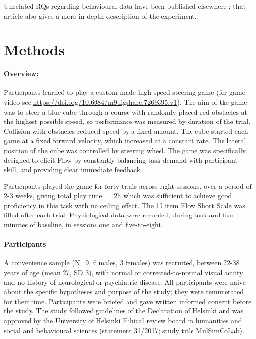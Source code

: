 \documentclass[10pt,letterpaper,floatsintext]{article}
\begin{document}
Unrelated RQs regarding behavioural data have been published elsewhere \cite{Cowley2019flow}; that article also gives a more in-depth description of the experiment.

\section{Methods}

\paragraph{Overview:}
Participants learned to play a custom-made high-speed steering game (for game video see \url{https://doi.org/10.6084/m9.figshare.7269395.v1}). The aim of the game was to steer a blue cube through a course with randomly placed red obstacles at the highest possible speed, so performance was measured by duration of the trial. Collision with obstacles reduced speed by a fixed amount. The cube started each game at a fixed forward velocity, which increased at a constant rate. The lateral position of the cube was controlled by steering wheel. The game was specifically designed to elicit Flow by constantly balancing task demand with participant skill, and providing clear immediate feedback.

Participants played the game for forty trials across eight sessions, over a period of 2-3 weeks, giving total play time = $~$2h which was sufficient to achieve good proficiency in this task with no ceiling effect. The 10 item Flow Short Scale \cite{Engeser2008} was filled after each trial. Physiological data were recorded, during task and five minutes of baseline, in sessions one and five-to-eight.


\paragraph{Participants}
A convenience sample (N=9, 6 males, 3 females) was recruited, between 22-38 years of age (mean 27, SD 3), with normal or corrected-to-normal visual acuity and no history of neurological or psychiatric disease. All participants were naive about the specific hypotheses and purpose of the study; they were remunerated for their time. Participants were briefed and gave written informed consent before the study. The study followed guidelines of the Declaration of Helsinki and was approved by the University of Helsinki Ethical review board in humanities and social and behavioural sciences (statement 31/2017; study title MulSimCoLab).
\end{document}

